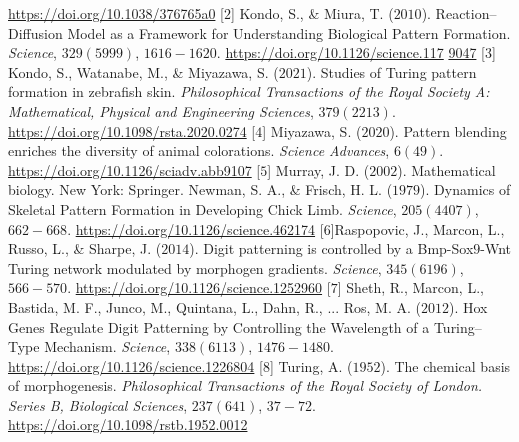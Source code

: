 \begin{multicols}{2}
		 \url{https://doi.org/10.1038/376765a0}
	\vskip 0.05cm
	[$2$] Kondo, S., \& Miura, T. ($2010$). Reaction--Diffusion Model as a Framework for Understanding Biological Pattern Formation. \textit{Science}, $329(5999)$, $1616-1620$. \url{https://doi.org/10.1126/science.117} \url{9047}
	\vskip 0.05cm
	[$3$] Kondo, S., Watanabe, M., \& Miyazawa, S. ($2021$). Studies of Turing pattern formation in zebrafish skin. \textit{Philosophical Transactions of the Royal Society A: Mathematical, Physical and Engineering Sciences}, $379(2213)$.
		 \url{https://doi.org/10.1098/rsta.2020.0274}
	\vskip 0.05cm
	[$4$] Miyazawa, S. ($2020$). Pattern blending enriches the diversity of animal colorations. \textit{Science Advances}, $6(49)$.
		 \url{https://doi.org/10.1126/sciadv.abb9107}
	\vskip 0.05cm
	[$5$] Murray, J. D. ($2002$). Mathematical biology. New York: Springer.
	Newman, S. A., \& Frisch, H. L. ($1979$). Dynamics of Skeletal Pattern Formation in Developing Chick Limb. \textit{Science}, $205(4407)$, $662-668$.
		 \url{https://doi.org/10.1126/science.462174}
	\vskip 0.05cm
	[$6$]Raspopovic, J., Marcon, L., Russo, L., \& Sharpe, J. ($2014$). Digit patterning is controlled by a Bmp-Sox$9$-Wnt Turing network modulated by morphogen gradients. \textit{Science}, $345(6196)$, $566-570$.
		 \url{https://doi.org/10.1126/science.1252960}
	\vskip 0.05cm
	[$7$] Sheth, R., Marcon, L., Bastida, M. F., Junco, M., Quintana, L., Dahn, R., ... Ros, M. A. ($2012$). Hox Genes Regulate Digit Patterning by Controlling the Wavelength of a Turing--Type Mechanism. \textit{Science}, $338(6113)$, $1476-1480$. 
		\url{https://doi.org/10.1126/science.1226804}
	\vskip 0.05cm
	[$8$] Turing, A. ($1952$). The chemical basis of morphogenesis. \textit{Philosophical Transactions of the Royal Society of London. Series B, Biological Sciences}, $237(641)$, $37-72$.
		 \url{https://doi.org/10.1098/rstb.1952.0012}
\end{multicols}